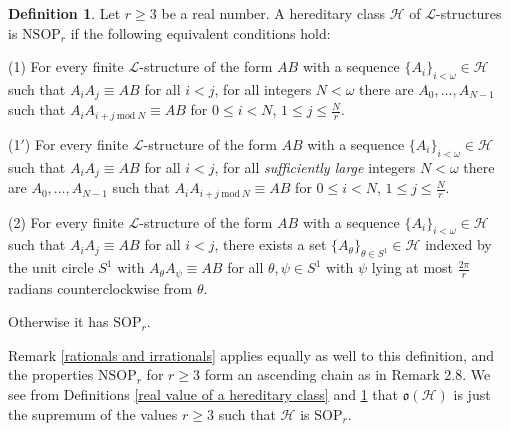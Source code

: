 \documentclass{amsart}
\theoremstyle{definition}
\newtheorem{definition}[theorem]{Definition}
\theoremstyle{remark}
\numberwithin{equation}{section}
\begin{document}
    \begin{definition}\label{real-valued hierarchy, hereditary class version}
    Let $r\geq 3$ be a real number. A hereditary class $\mathcal{H}$ of $\mathcal{L}$-structures is $\mathrm{NSOP}_{r}$ if the following equivalent conditions hold: 

    (1) For every finite $\mathcal{L}$-structure of the form $AB$ with a sequence $\{A_{i}\}_{i < \omega} \in \mathcal{H}$ such that $A_{i}A_{j} \equiv AB$ for all $i < j$, for all integers $N < \omega$ there are $A_{0}, \ldots, A_{N -1} $ such that $A_{i} A_{i+j \mathrm{\: mod \:} N} \equiv AB$ for $0 \leq i <N$, $1 \leq j \leq \frac{N}{r}$.

    (1$'$) For every finite $\mathcal{L}$-structure of the form $AB$ with a sequence $\{A_{i}\}_{i < \omega} \in \mathcal{H}$ such that $A_{i}A_{j} \equiv AB$ for all $i < j$, for all \textit{sufficiently large} integers $N < \omega$ there are $A_{0}, \ldots, A_{N -1} $ such that $A_{i} A_{i+j \mathrm{\: mod \:} N} \equiv AB$ for $0 \leq i <N$, $1 \leq j \leq \frac{N}{r}$.

    (2) For every finite $\mathcal{L}$-structure of the form $AB$ with a sequence $\{A_{i}\}_{i < \omega} \in \mathcal{H}$ such that $A_{i}A_{j} \equiv AB$ for all $i < j$, there exists a set $\{ A_{\theta}\}_{\theta \in S^{1}} \in \mathcal{H}$ indexed by the unit circle $S^{1}$ with $A_{\theta}A_{\psi} \equiv AB$ for all $\theta, \psi \in S^{1}$ with $\psi$ lying at most $\frac{2\pi}{r}$ radians counterclockwise from $\theta$.

 Otherwise it has $\mathrm{SOP}_{r}$.
\end{definition}

Remark \ref{rationals and irrationals} applies equally as well to this definition, and the properties $\mathrm{NSOP}_{r}$ for $r \geq 3$ form an ascending chain as in Remark 2.8. We see from Definitions \ref{real value of a hereditary class} and \ref{real-valued hierarchy, hereditary class version} that $\mathfrak{o}(\mathcal{H})$ is just the supremum of the values $r \geq 3$ such that $\mathcal{H}$ is $\mathrm{SOP}_{r}$.
\end{document}
